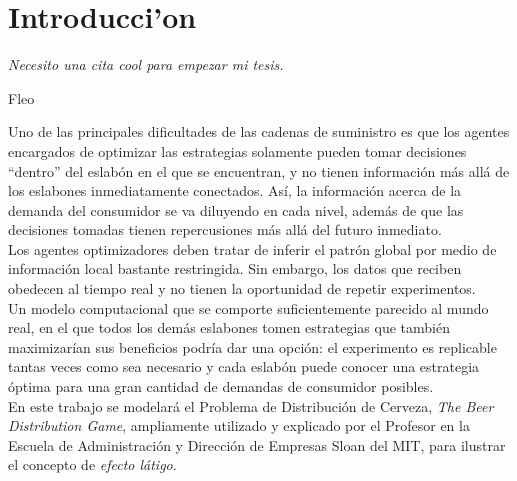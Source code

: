 \chapter{Introducci'on}

\textit{Necesito una cita cool para empezar mi tesis.}
\begin{flushright}
 Fleo
 \end{flushright}

\vspace{10 pt}





Uno de las principales dificultades de las cadenas de suministro es que los agentes encargados de optimizar las estrategias solamente pueden tomar decisiones ``dentro'' del eslabón en el que se encuentran, y no tienen información más allá de los eslabones inmediatamente conectados. Así, la información acerca de la demanda del consumidor se va diluyendo en cada nivel, además de que las decisiones tomadas tienen repercusiones más allá del futuro inmediato. \\

Los agentes optimizadores deben tratar de inferir el patrón global por medio de información local bastante restringida. Sin embargo, los datos que reciben obedecen al tiempo real y no tienen la oportunidad de repetir experimentos.\\




Un modelo computacional que se comporte suficientemente parecido al mundo real, en el que todos los demás eslabones tomen estrategias que también maximizarían sus beneficios podría dar una opción: el experimento es replicable tantas veces como sea necesario y cada eslabón puede conocer una estrategia óptima para una gran cantidad de demandas de consumidor posibles.\\

En este trabajo se modelará el Problema de Distribución de Cerveza, \textit{The Beer Distribution Game}, ampliamente utilizado y explicado por el Profesor \citet{Sterman} en la Escuela de Administraci\'on y Direcci\'on de Empresas Sloan del MIT, para ilustrar el concepto de \textit{efecto l\'atigo}.\\

